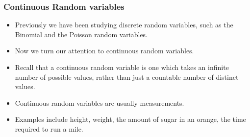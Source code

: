 \documentclass[a4]{beamer}
\begin{document}
\begin{frame}
\frametitle{Continuous Random variables}
\begin{itemize}
\item Previously we have been studying discrete random variables, such as the Binomial and the Poisson random variables.
\item Now we turn our attention to continuous random variables.
\item Recall that a continuous random variable is one which takes an infinite number of possible values, rather than just a countable number of distinct values.
\item Continuous random variables are usually measurements.
\item Examples include height, weight, the amount of sugar in an orange, the time required to run a mile.
\end{itemize}

\end{frame}
\end{document}
